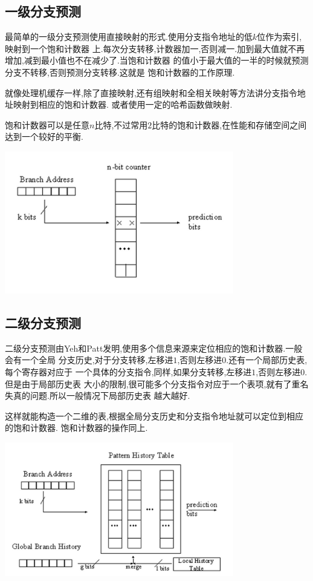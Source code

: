 \documentclass[adobefonts, nocap]{ctexart}
\begin{document}
    \subsection{一级分支预测}
      最简单的一级分支预测使用直接映射的形式.使用分支指令地址的低$k$位作为索引,映射到一个饱和计数器
      上.每次分支转移,计数器加一,否则减一.加到最大值就不再增加,减到最小值也不在减少了.当饱和计数器
      的值小于最大值的一半的时候就预测分支不转移,否则预测分支转移.这就是
      饱和计数器的工作原理.

      就像处理机缓存一样,除了直接映射,还有组映射和全相关映射等方法讲分支指令地址映射到相应的饱和计数器.
      或者使用一定的哈希函数做映射.

      饱和计数器可以是任意$n$比特,不过常用$2$比特的饱和计数器,在性能和存储空间之间达到一个较好的平衡.

      \begin{center}
        \includegraphics[width=10cm]{1.png}
      \end{center}
    \subsection{二级分支预测}
      二级分支预测由Yeh和Patt发明,使用多个信息来源来定位相应的饱和计数器.一般会有一个全局
      分支历史,对于分支转移,左移进$1$,否则左移进$0$.还有一个局部历史表,每个寄存器对应于
      一个具体的分支指令,同样,如果分支转移,左移进$1$,否则左移进$0$.但是由于局部历史表
      大小的限制,很可能多个分支指令对应于一个表项,就有了重名失真的问题.所以一般情况下局部历史表
      越大越好.

      这样就能构造一个二维的表,根据全局分支历史和分支指令地址就可以定位到相应的饱和计数器.
      饱和计数器的操作同上.

      \begin{center}
        \includegraphics[width=10cm]{2.png}
      \end{center}
\end{document}
